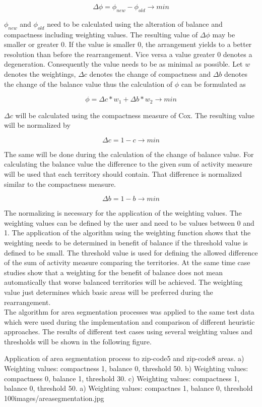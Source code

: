 \[ \mathit{\Delta \phi = \phi_{new}-\phi_{old} \to min}\]

$\phi_{new}$ and $\phi_{old}$ need to be calculated using the alteration of balance and compactness including weighting values. The resulting value of $\Delta \phi$ may be smaller or greater 0. If the value is smaller 0, the arrangement yields to a better resolution than before the rearrangement. Vice versa a value greater 0 denotes a degeneration. Consequently the value needs to be as minimal as possible. 
Let $w$ denotes the weightings, $\Delta c$ denotes the change of compactness and $\Delta b$ denotes the change of the balance value thus the calculation of $\phi$ can be formulated as

\[ \mathit{\phi = \Delta c * w_{1} + \Delta b * w_{2} \to min}\]

$\Delta c$ will be calculated using the compactness measure of Cox. The resulting value will be normalized by 

\[ \mathit{\Delta c = 1 - c \to min}\]

The same will be done during the calculation of the change of balance value. For calculating the balance value the difference to the given sum of activity measure will be used that each territory should contain. That difference is normalized similar to the compactness measure.

\[ \mathit{\Delta b = 1 - b \to min}\]

The normalizing is necessary for the application of the weighting values. The weighting values can be defined by the user and need to be values between 0 and 1. The application of the algorithm using the weighting function shows that the weighting needs to be determined in benefit of balance if the threshold value is defined to be small. The threshold value is used for defining the allowed difference of the sum of activity measure comparing the territories. At the same time case studies show that a weighting for the benefit of balance does not mean automatically that worse balanced territories will be achieved. The weighting value just determines which basic areas will be preferred during the rearrangement. \\ 
The algorithm for area segmentation processes was applied to the same test data which were used during the implementation and comparison of different heuristic approaches. The results of different test cases using several weighting values and thresholds will be shown in the following figure.

\begin{figureOwn}{Application of area segmentation process to zip-code5 and zip-code8 areas. a) Weighting values: compactness 1, balance 0, threshold 50. b) Weighting values: compactness 0, balance 1, threshold 30. c) Weighting values: compactness 1, balance 0, threshold 50. a) Weighting values: compactnes 1, balance 0, threshold 100}{images/areasegmentation.jpg}\end{figureOwn}

